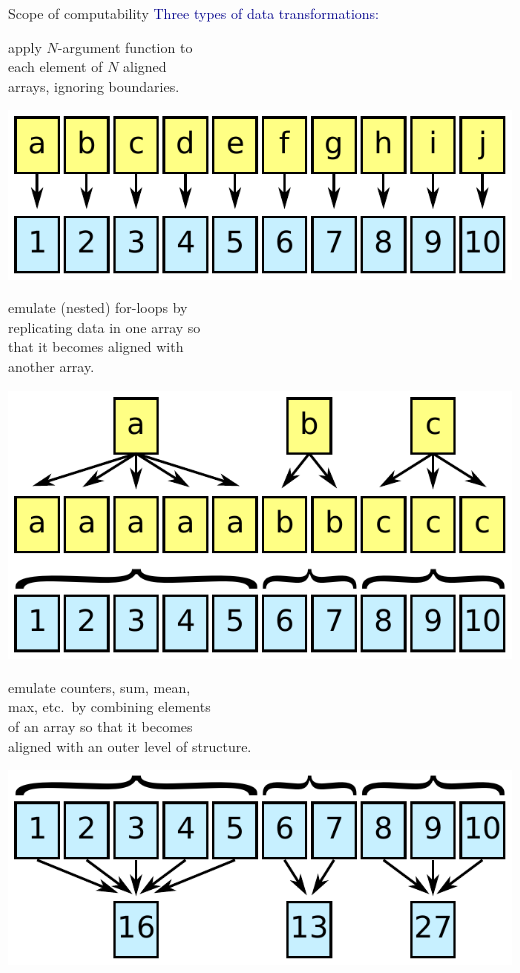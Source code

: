\documentclass{beamer}
\begin{document}
\begin{frame}{Scope of computability}
\textcolor{darkblue}{Three types of data transformations:}

\vspace{0.2 cm}
\begin{description}\setlength{\itemsep}{0.5 cm}
\item[Flat:] apply $N$-argument function to \\ each element of $N$ aligned \\ arrays, ignoring boundaries.

\vspace{-3\baselineskip}
\hfill \includegraphics[width=0.37\linewidth]{flat.pdf}

\vspace{0.3 cm}
\item[Explode:] emulate (nested) for-loops by \\ replicating data in one array so \\ that it becomes aligned with \\ another array.

\vspace{-4\baselineskip}
\hfill \includegraphics[width=0.37\linewidth]{explode.pdf}

\item[Reduce:] emulate counters, sum, mean, \\ max, etc.\ by combining elements \\ of an array so that it becomes \\ aligned with an outer level of structure.

\vspace{-4\baselineskip}
\hfill \includegraphics[width=0.37\linewidth]{reduce.pdf}
\end{description}
\end{frame}
\end{document}
